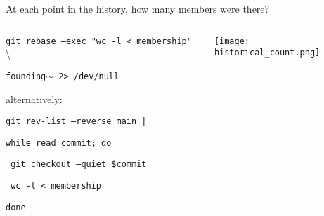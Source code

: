 \documentclass{beamer}
\begin{document}
\begin{frame}
    \centering
    \Large At each point in the history, how many members were there?

    \pause
    \vspace{\baselineskip}

    \begin{columns}[onlytextwidth]
        \begin{column}{0.85\textwidth}
            \small{\texttt{git rebase --exec "wc -l < membership"} \textbackslash

            \texttt{founding$\sim$ 2> /dev/null}

                \vspace{\baselineskip}
                alternatively:
                \vspace{\baselineskip}

                \texttt{git rev-list --reverse main |}

                \texttt{while read commit; do}

                \texttt{    git checkout --quiet \$commit}

                \texttt{    wc -l < membership}

                \texttt{done}}
        \end{column}
        \begin{column}{0.15\textwidth}
            \texttt{[image: historical\_count.png]}
        \end{column}
    \end{columns}
\end{frame}
\end{document}
